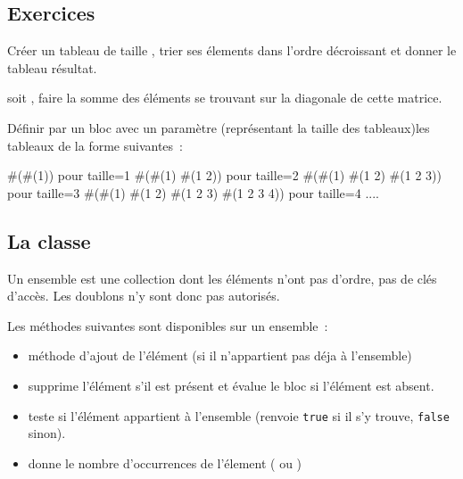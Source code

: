 \subsection*{Exercices}

\begin{itemize}
\exoitem Cr\'eer un tableau de taille , trier ses \'elements dans l'ordre d\'ecroissant et donner le tableau r\'esultat.

\exoitem soit , faire la somme des \'el\'ements se trouvant sur la diagonale de cette matrice.

\exoitem D\'efinir par un bloc avec un param\`etre (repr\'esentant la taille des tableaux)les tableaux de la forme suivantes~:

\begin{scode}
\#(\#(1))                    pour taille=1
\#(\#(1) \#(1 2))                pour taille=2
\#(\#(1) \#(1 2) \#(1 2 3))          pour taille=3
\#(\#(1) \#(1 2) \#(1 2 3) \#(1 2 3 4))     pour taille=4
....
\end{scode}
\end{itemize}


\subsection{La classe }

Un ensemble est une collection dont les \'el\'ements n'ont pas d'ordre, pas de
cl\'es d'acc\`es. Les doublons n'y sont donc pas autoris\'es.


Les m\'ethodes suivantes sont disponibles sur un ensemble~:
\begin{itemize}
\item
{} m\'ethode d'ajout de l'\'el\'ement  (si il n'appartient pas d\'eja \`a l'ensemble)

\item {} supprime l'\'el\'ement
 s'il est pr\'esent  et  \'evalue le bloc  si l'\'el\'ement est absent.

\item
{} teste si l'\'el\'ement  appartient \`a l'ensemble (renvoie \verb|true| si il s'y trouve, \verb|false| sinon).

\item
{} donne le nombre d'occurrences de l'\'element
 ( ou )
\end{itemize}


